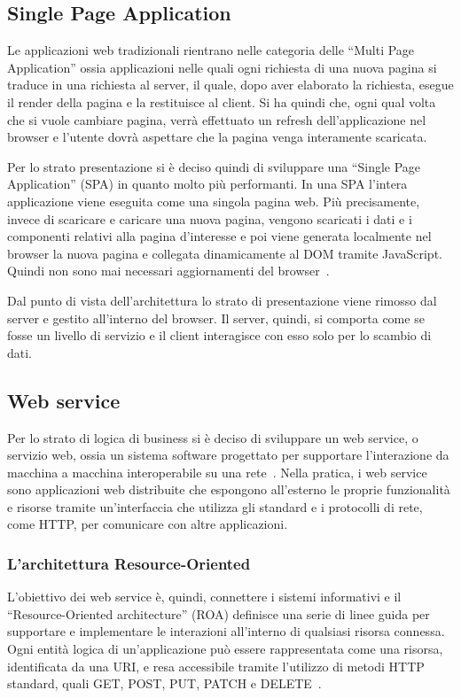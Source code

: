\subsection{Single Page Application}
Le applicazioni web tradizionali rientrano nelle categoria delle ``Multi Page Application'' ossia applicazioni nelle quali ogni richiesta di una nuova pagina si traduce in una richiesta al server, il quale, dopo aver elaborato la richiesta, esegue il render della pagina e la restituisce al client. Si ha quindi che, ogni qual volta che si vuole cambiare pagina, verr\`a effettuato un refresh dell'applicazione nel browser e l'utente dovr\`a aspettare che la pagina venga interamente scaricata.

Per lo strato presentazione si \`e deciso quindi di sviluppare una ``Single Page Application'' (SPA) in quanto molto pi\`u performanti. In una SPA l'intera applicazione viene eseguita come una singola pagina web. Pi\`u precisamente, invece di scaricare e caricare una nuova pagina, vengono scaricati i dati e i componenti relativi alla pagina d'interesse e poi viene generata localmente nel browser la nuova pagina e collegata dinamicamente al DOM tramite JavaScript. Quindi non sono mai necessari aggiornamenti del browser~\cite{EmmitScott}. 

Dal punto di vista dell'architettura lo strato di presentazione viene rimosso dal server e gestito all'interno del browser. Il server, quindi, si comporta come se fosse un livello di servizio e il client interagisce con esso solo per lo scambio di dati.

\subsection{Web service}
Per lo strato di logica di business si \`e deciso di sviluppare un web service, o servizio web, ossia un sistema software progettato per supportare l'interazione da macchina a macchina interoperabile su una rete~\cite{webservicesarchitecture}. Nella pratica, i web service sono applicazioni web distribuite che espongono all'esterno le proprie funzionalit\`a e risorse tramite un'interfaccia che utilizza gli standard e i protocolli di rete, come HTTP, per comunicare con altre applicazioni.

\subsubsection{L'architettura Resource-Oriented}
L'obiettivo dei web service \`e, quindi, connettere i sistemi informativi e il ``Resource-Oriented architecture'' (ROA) definisce una serie di linee guida per supportare e implementare le interazioni all'interno di qualsiasi risorsa connessa. Ogni entit\`a logica di un'applicazione pu\`o essere rappresentata come una risorsa, identificata da una URI, e resa accessibile tramite l'utilizzo di metodi HTTP standard, quali GET, POST, PUT, PATCH e DELETE~\cite{SubramanianRaj}.

